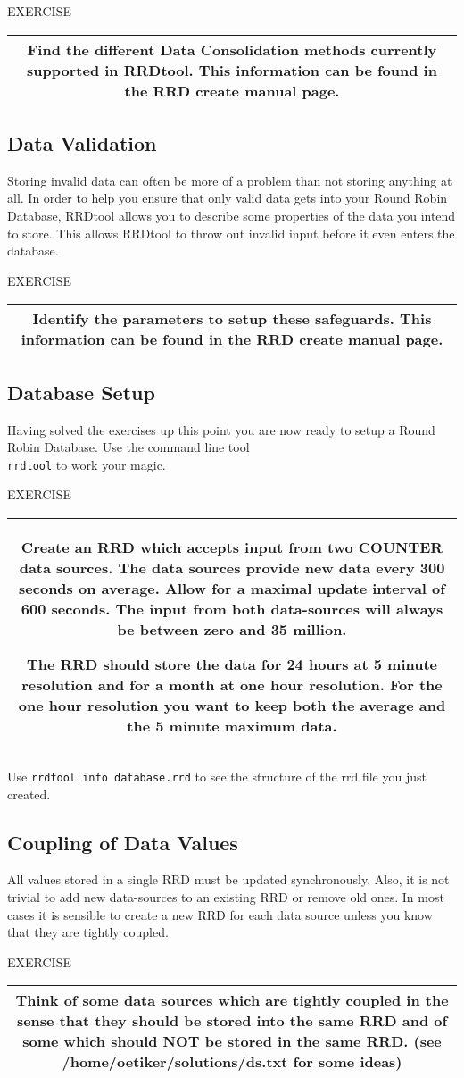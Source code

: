 \documentclass[a4paper,12pt]{article}
\newenvironment{work}{\textsf{\tiny EXERCISE}\nopagebreak\\[0.3ex]\begin{tabular}{|c|}
 \hline
 \begin{minipage}{0.965\linewidth}%
 \setlength{\parskip}{1.6ex plus 0.6ex minus 0.4ex}%
 \rule{0pt}{2.8ex}\ignorespaces}
{\rule[-1.8ex]{0pt}{0pt}\end{minipage}\\
 \hline
 \end{tabular}}
\newcommand{\ex}[1]{\subsection{#1}}
\newcommand{\cmd}[1]{\texttt{\mbox{#1}}}
\begin{document}
\begin{work}
  Find the different Data Consolidation methods currently supported in
  RRDtool. This information can be found in the RRD create manual
  page.
\end{work}

\ex{Data Validation}

Storing invalid data can often be more of a problem than not storing
anything at all. In order to help you ensure that only valid data gets
into your Round Robin Database, RRDtool allows you to
describe some properties of the data you intend to store. This allows
RRDtool to throw out invalid input before it even enters the database.

\begin{work}
Identify the parameters to setup these safeguards. This information
can be found in the RRD create manual page.\end{work}

\ex{Database Setup}

Having solved the exercises up this point you are now ready to setup a
Round Robin Database. Use the command line tool\\
\cmd{rrdtool} to work your magic. 

\begin{work}
  Create an RRD which accepts input from two COUNTER
  data sources. The data sources provide new data every 300 seconds on
  average. Allow for a maximal update interval of 600 seconds. The
  input from both data-sources will always be between zero and 35
  million.
  
  The RRD should store the data for 24 hours at 5 minute resolution
  and for a month at one hour resolution. For the one hour resolution
  you want to keep both the average and the 5 minute maximum data.

\end{work}

Use \cmd{rrdtool info database.rrd} to see the structure of the rrd file you
just created.

\ex{Coupling of Data Values}

All values stored in a single RRD must be updated synchronously. Also,
it is not trivial to add new data-sources to an existing RRD or remove
old ones. In most cases it is sensible to create a new RRD for each
data source unless you know that they are tightly coupled.

\begin{work}
  Think of some data sources which are tightly coupled in the sense that
  they should be stored into the same RRD and of some which should NOT be
  stored in the same RRD. (see /home/oetiker/solutions/ds.txt for some ideas)
\end{work}
\end{document}
